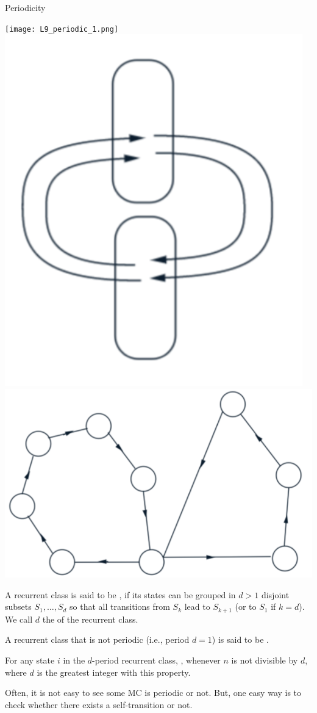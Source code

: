 \begin{frame}{Periodicity}
  
\vspace{-0.3cm}
  \centering
  \texttt{[image: L9\_periodic\_1.png]}
  \hspace{1cm}
  \includegraphics[width=0.15\columnwidth]{L9_periodic_2.png}
  \hspace{1cm}
  \includegraphics[width=0.23\columnwidth]{L9_periodic_3.png}

\vspace{-0.3cm}
  \plitemsep 0.05in
  \bci
  
\item<2->  A recurrent class  is said to be , if
  its states can be grouped in $d >1$ disjoint subsets $S_1, \ldots,
  S_d$ so that all transitions from $S_k$ lead to $S_{k+1}$ (or to
  $S_1$ if $k=d$). We call $d$ the  of the recurrent class. 
  
  
  
\item<3-> A recurrent class that is not periodic (i.e., period $d=1$) is said to be
  .
  

\item<4-> For any state $i$ in the $d$-period recurrent class,
  , whenever $n$ is not divisible by $d$, where $d$ is the greatest
  integer with this property. 

\item<5-> Often, it is not easy to see some MC is periodic or
  not. But, one easy way is to check whether there exists a
  self-transition or not.  

  
  
  \eci
  
\end{frame}


